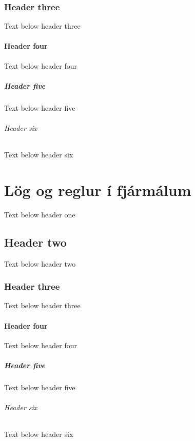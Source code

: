 \documentclass[a4paper,10pt,icelandic]{sphinxmanual}
\begin{document}
\subsection{Header three}
\label{\detokenize{taekni-og-fjarmal/index:header-three}}
\sphinxAtStartPar
Text below header three


\subsubsection{Header four}
\label{\detokenize{taekni-og-fjarmal/index:header-four}}
\sphinxAtStartPar
Text below header four


\paragraph{Header five}
\label{\detokenize{taekni-og-fjarmal/index:header-five}}
\sphinxAtStartPar
Text below header five


\subparagraph{Header six}
\label{\detokenize{taekni-og-fjarmal/index:header-six}}
\sphinxAtStartPar
Text below header six

\sphinxstepscope


\chapter{Lög og reglur í fjármálum}
\label{\detokenize{log-og-reglur-i-fjarmalum/index:log-og-reglur-i-fjarmalum}}\label{\detokenize{log-og-reglur-i-fjarmalum/index::doc}}
\sphinxAtStartPar
Text below header one


\section{Header two}
\label{\detokenize{log-og-reglur-i-fjarmalum/index:header-two}}
\sphinxAtStartPar
Text below header two


\subsection{Header three}
\label{\detokenize{log-og-reglur-i-fjarmalum/index:header-three}}
\sphinxAtStartPar
Text below header three


\subsubsection{Header four}
\label{\detokenize{log-og-reglur-i-fjarmalum/index:header-four}}
\sphinxAtStartPar
Text below header four


\paragraph{Header five}
\label{\detokenize{log-og-reglur-i-fjarmalum/index:header-five}}
\sphinxAtStartPar
Text below header five


\subparagraph{Header six}
\label{\detokenize{log-og-reglur-i-fjarmalum/index:header-six}}
\sphinxAtStartPar
Text below header six



\renewcommand{\indexname}{Atriðaskrá}
\printindex
\end{document}
